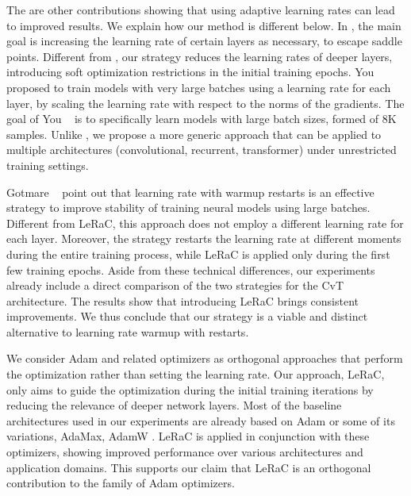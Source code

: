 \documentclass[10pt,twocolumn,letterpaper]{article}
\begin{document}
The are other contributions \cite{Singh-ICMLA-2015,You-arXiv-2017} showing that using adaptive learning rates can lead to improved results. We explain how our method is different below. In \cite{Singh-ICMLA-2015}, the main goal is increasing the learning rate of certain layers as necessary, to escape saddle points. Different from \cite{Singh-ICMLA-2015}, our strategy reduces the learning rates of deeper layers, introducing soft optimization restrictions in the initial training epochs. You \etal~\cite{You-arXiv-2017} proposed to train models with very large batches using a learning rate for each layer, by scaling the learning rate with respect to the norms of the gradients. The goal of You \etal~\cite{You-arXiv-2017} is to specifically learn models with large batch sizes, \eg formed of 8K samples. Unlike \cite{You-arXiv-2017}, we propose a more generic approach that can be applied to multiple architectures (convolutional, recurrent, transformer) under unrestricted training settings. 

Gotmare \etal~\cite{Gotmare-ICLR-2019} point out that learning rate with warmup restarts is an effective strategy to improve stability of training neural models using large batches. Different from LeRaC, this approach does not employ a different learning rate for each layer. Moreover, the strategy restarts the learning rate at different moments during the entire training process, while LeRaC is applied only during the first few training epochs. Aside from these technical differences, our experiments already include a direct comparison of the two strategies for the CvT architecture. The results show that introducing LeRaC brings consistent improvements. We thus conclude that our strategy is a viable and distinct alternative to learning rate warmup with restarts. 

We consider Adam \cite{Kingma-ICLR-1015} and related optimizers as orthogonal approaches that perform the optimization rather than setting the learning rate. Our approach, LeRaC, only aims to guide the optimization during the initial training iterations by reducing the relevance of deeper network layers. Most of the baseline architectures used in our experiments are already based on Adam or some of its variations, \eg AdaMax, AdamW \cite{Loshchilov-ICLR-2019}. LeRaC is applied in conjunction with these optimizers, showing improved performance over various architectures and application domains. This supports our claim that LeRaC is an orthogonal contribution to the family of Adam optimizers. 
\end{document}
